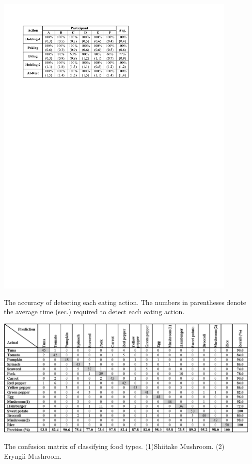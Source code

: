 \begin{table}[t]
\begin{center}
\includegraphics[width=12cm]{image/tables01.pdf}
\caption{The accuracy of detecting each eating action. The numbers in parentheses denote the average time (sec.) required to detect each eating action.}
\label{table1}
\end{center}
\end{table}

\begin{table}[t]
\centering
\includegraphics[width=15cm]{image/table2.ps}
\caption{The confusion matrix of classifying food types. (1)Shiitake Mushroom.  (2) Eryngii Mushroom.}
\label{table2}
\end{table}

